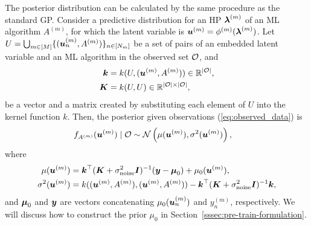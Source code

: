 The posterior distribution can be calculated by the same procedure as the standard GP.
%
Consider a predictive distribution for an HP
$\boldsymbol{\lambda}^{(m)}$ 
of an ML algorithm $A^{(m)}$, for which the latent variable is
$\boldsymbol{u}^{(m)} = \phi^{(m)}(\boldsymbol{\lambda}^{(m)})$.
%
Let
$U = \bigcup_{m \in [M]} \{ (\boldsymbol{u}_n^{(m)}, A^{(m)}) \}_{n \in [N_m]}$
be a set of pairs of an embedded latent variable and an ML algorithm in the observed set ${\mathcal O}$, and
\begin{align*}
 \boldsymbol{k} &= k(U, (\boldsymbol{u}^{(m)}, A^{(m)}))
 \in \mathbb{R}^{|{\mathcal O}|}, 
 \\
 \boldsymbol{K} &= 
 k(U, U)
 \in \mathbb{R}^{|{\mathcal O}| \times |{\mathcal O}|}, 
\end{align*}
be a vector and a matrix created by substituting each element of $U$ into the kernel function $k$.
%
Then, the posterior given observations (\ref{eq:observed_data}) is 
\begin{align*}
 f_{A^{(m)}}(\boldsymbol{u}^{(m)}) \mid {\mathcal O} &\sim 
 {\mathcal N} \left( \mu(\boldsymbol{u}^{(m)}), \sigma^2(\boldsymbol{u}^{(m)}) \right),  
\end{align*}
where 
\begin{align*}
 \mu(\boldsymbol{u}^{(m)}) &= 
 \boldsymbol{k}^\top 
 (\boldsymbol{K} + \sigma_{\rm noise}^2\boldsymbol{I})^{-1} (\boldsymbol{y} - \boldsymbol{\mu}_0) + \mu_0(\boldsymbol{u}^{(m)}), 
 \\
 \sigma^2(\boldsymbol{u}^{(m)}) &= 
 k((\boldsymbol{u}^{(m)}, A^{(m)}), (\boldsymbol{u}^{(m)}, A^{(m)})) - \boldsymbol{k}^{\top}(\boldsymbol{K}+ \sigma_{\rm noise}^2 \boldsymbol{I})^{-1} \boldsymbol{k},
\end{align*}
and $\boldsymbol{\mu}_0$ and $\boldsymbol{y}$ are vectors concatenating 
$\mu_0(\boldsymbol{u}_n^{(m)})$ 
and 
$y_n^{(m)}$, 
respectively. 
%
We will discuss how to construct the prior $\mu_0$ in Section~\ref{sssec:pre-train-formulation}.




